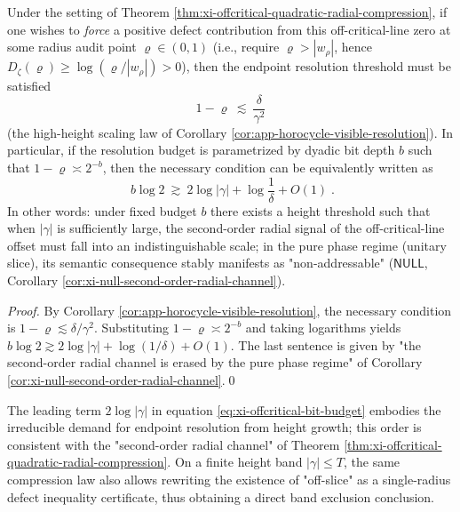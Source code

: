 \label{subsec:xi-certificate-coherence-orthogonal-axis-capacity-part3}

\begin{corollary}\label{cor:xi-offcritical-visibility-threshold-bit-budget}
Under the setting of Theorem \ref{thm:xi-offcritical-quadratic-radial-compression},
if one wishes to \emph{force} a positive defect contribution from this off-critical-line zero at some radius audit point \(\varrho\in(0,1)\) (i.e., require \(\varrho>|w_\rho|\), hence \(D_\zeta(\varrho)\ge \log(\varrho/|w_\rho|)>0\)),
then the endpoint resolution threshold must be satisfied
\[
1-\varrho\ \lesssim\ \frac{\delta}{\gamma^2}
\]
(the high-height scaling law of Corollary \ref{cor:app-horocycle-visible-resolution}).
In particular, if the resolution budget is parametrized by dyadic bit depth \(b\) such that
\(
1-\varrho\asymp 2^{-b}
\),
then the necessary condition can be equivalently written as
\begin{equation}\label{eq:xi-offcritical-bit-budget}
\boxed{\;
b\log 2\ \gtrsim\ 2\log|\gamma|+\log\frac{1}{\delta}+O(1)\; }.
\end{equation}
In other words: under fixed budget \(b\) there exists a height threshold such that when \(|\gamma|\) is sufficiently large, the second-order radial signal of the off-critical-line offset must fall into an indistinguishable scale;
in the pure phase regime (unitary slice), its semantic consequence stably manifests as "non-addressable" (\(\mathsf{NULL}\), Corollary \ref{cor:xi-null-second-order-radial-channel}).
\end{corollary}

\begin{proof}
By Corollary \ref{cor:app-horocycle-visible-resolution}, the necessary condition is \(1-\varrho\lesssim \delta/\gamma^2\).
Substituting \(1-\varrho\asymp 2^{-b}\) and taking logarithms yields
\(
b\log 2\gtrsim 2\log|\gamma|+\log(1/\delta)+O(1)
\).
The last sentence is given by "the second-order radial channel is erased by the pure phase regime" of Corollary \ref{cor:xi-null-second-order-radial-channel}.\qed
\end{proof}

The leading term \(2\log|\gamma|\) in equation \eqref{eq:xi-offcritical-bit-budget} embodies the irreducible demand for endpoint resolution from height growth;
this order is consistent with the "second-order radial channel" of Theorem \ref{thm:xi-offcritical-quadratic-radial-compression}.
On a finite height band \(|\gamma|\le T\), the same compression law also allows rewriting the existence of "off-slice" as a single-radius defect inequality certificate, thus obtaining a direct band exclusion conclusion.

